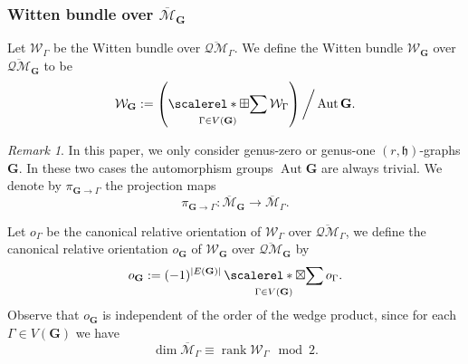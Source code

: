 \documentclass[11pt]{amsart}
\theoremstyle{definition}
\theoremstyle{remark}
\newtheorem{rmk}[dummy]{Remark}
\newcommand{\oQMb}{{\overline{\mathcal{QM}}}}
\newcommand{\<}{\left<}
\renewcommand{\>}{\right>}
\numberwithin{equation}{section}
\def\Mbar{{\overline{\mathcal M}}}
\def\h{{\mathfrak h}}
\DeclareMathOperator*{\bboxplus}{\scalerel*{\boxplus}{\sum}}
\DeclareMathOperator*{\bboxtimes}{\scalerel*{\boxtimes}{\sum}}
\begin{document}
\subsubsection{Witten bundle over $\Mbar_\mathbf{G}$}
Let $\mathcal W_\Gamma$ be the Witten bundle over $\oQMb_\Gamma$. We define the Witten bundle $\mathcal W_\mathbf{G}$ over $\oQMb_\mathbf{G}$ to be 
$$
 \mathcal W_\mathbf{G}:= \left(\bboxplus_{\Gamma\in V(\mathbf{G})}\mathcal W_\Gamma\right)\bigg\slash \operatorname{Aut} \mathbf{G}.
$$
\begin{rmk}\label{rmk aut trivial}
    In %
this %
paper,  we %
only consider genus-zero or genus-one  $(r,\h)$-graphs $\mathbf{G}$. In these two cases the automorphism groups $\operatorname{Aut}\mathbf{G}$ are always trivial. We denote by $\pi_{\mathbf{G}\to\Gamma}$ the projection %
maps 
    $$
\pi_{\mathbf{G}\to\Gamma}\colon \Mbar_{\mathbf{G}}\to \Mbar_\Gamma. 
$$
\end{rmk}
Let $o_\Gamma$ %
be the canonical relative orientation of $\mathcal W_\Gamma$ over $\oQMb_\Gamma$, we define the canonical relative orientation $o_\mathbf{G}$ of $\mathcal W_\mathbf{G}$ over $\oQMb_\mathbf{G}$ by
\begin{equation}\label{eq orientation point insertion}
    o_\mathbf{G}:=(-1)^{\lvert E(\mathbf{G})\rvert}\bboxtimes_{\Gamma\in V(\mathbf{G})}  o_\Gamma.
\end{equation}
Observe that $o_\mathbf{G}$ is independent of the order of the wedge product, since for each $\Gamma\in V(\mathbf{G})$ we have 
$$
\dim \Mbar_\Gamma \equiv \operatorname{rank} \mathcal W_\Gamma \mod 2.
$$
\end{document}
